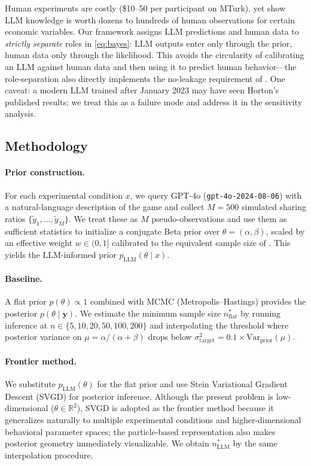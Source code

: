 \documentclass[11pt]{article}
\begin{document}
Human experiments are costly (\$10--50 per participant on MTurk), yet
\citet{gao2026measure} show LLM knowledge is worth dozens to hundreds of
human observations for certain economic variables.
Our framework assigns LLM predictions and human data to \emph{strictly
separate} roles in \eqref{eq:bayes}: LLM outputs enter only through the
prior, human data only through the likelihood.
This avoids the circularity of calibrating an LLM against human data and
then using it to predict human behavior---the role-separation also
directly implements the no-leakage requirement of \citet{ludwig2025econometrics}.
One caveat: a modern LLM trained after January 2023 may have seen
Horton's published results; we treat this as a failure mode and address it
in the sensitivity analysis.

\subsection{Methodology}

\paragraph{Prior construction.}
For each experimental condition $x$, we query GPT-4o
(\texttt{gpt-4o-2024-08-06}) with a natural-language description of the game
and collect $M = 500$ simulated sharing ratios $\{\tilde{y}_1, \ldots,
\tilde{y}_M\}$.
We treat these as $M$ pseudo-observations and use them as sufficient
statistics to initialize a conjugate Beta prior over $\theta = (\alpha,
\beta)$, scaled by an effective weight $w \in (0,1]$ calibrated to the
equivalent sample size of \citet{gao2026measure}.
This yields the LLM-informed prior $p_{\mathrm{LLM}}(\theta \mid x)$.

\paragraph{Baseline.}
A flat prior $p(\theta) \propto 1$ combined with MCMC (Metropolis--Hastings)
provides the posterior $p(\theta \mid \mathbf{y})$.
We estimate the minimum sample size $n^*_{\mathrm{flat}}$ by running
inference at $n \in \{5, 10, 20, 50, 100, 200\}$ and interpolating the
threshold where posterior variance on $\mu = \alpha/(\alpha+\beta)$ drops
below $\sigma^2_{\mathrm{target}} = 0.1 \times \mathrm{Var}_{\mathrm{prior}}(\mu)$.

\paragraph{Frontier method.}
We substitute $p_{\mathrm{LLM}}(\theta)$ for the flat prior and use Stein
Variational Gradient Descent (SVGD) for posterior inference.
Although the present problem is low-dimensional ($\theta \in \mathbb{R}^2$),
SVGD is adopted as the frontier method because it generalizes naturally to
multiple experimental conditions and higher-dimensional behavioral parameter
spaces; the particle-based representation also makes posterior geometry
immediately visualizable.
We obtain $n^*_{\mathrm{LLM}}$ by the same interpolation procedure.
\end{document}
